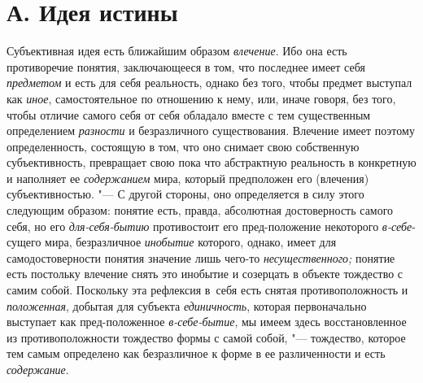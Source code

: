 \section[А. Идея истины]{А. Идея истины}

Субъективная идея есть ближайшим образом {\em влечение}. Ибо она
есть противоречие понятия, заключающееся в том, что последнее имеет себя
{\em предметом} и есть
для себя реальность, однако без того, чтобы предмет выступал как {\em иное},
самостоятельное по отношению к нему, или, иначе говоря, без
того, чтобы отличие самого себя от себя обладало вместе с тем существенным
определением {\em разности} и безразличного существования. Влечение имеет
поэтому определенность, состоящую в том, что оно снимает свою собственную
субъективность, превращает свою пока что абстрактную реальность
в конкретную и наполняет ее {\em содержанием} мира,
который предположен его (влечения) субъективностью. "--- С другой
стороны, оно определяется в силу этого следующим образом: понятие
есть, правда, абсолютная достоверность самого себя, но его
{\em для-себя-бытию} противостоит его пред-положение некоторого
{\em в-себе}-сущего мира, безразличное {\em инобытие}
которого, однако, имеет для самодостоверности понятия
значение лишь чего-то {\em несущественного;}
понятие есть постольку влечение снять это инобытие и
созерцать в объекте тождество с самим собой. Поскольку эта рефлексия в~себя
есть снятая противоположность и {\em положенная}, добытая
для субъекта {\em единичность}, которая первоначально выступает как
пред-положенное {\em в-себе-бытие}, мы
имеем здесь восстановленное из противоположности тождество формы с самой
собой, "--- тождество, которое тем самым
определено как безразличное к форме в ее различенности и
есть {\em содержание}.

